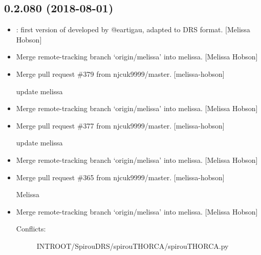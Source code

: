 \documentclass[a4paper,10pt,english]{report}
\begin{document}
\subsection{0.2.080 (2018-08-01)}
\label{\detokenize{misc/changelog:id382}}\begin{itemize}
\item {} 
: first version of  developed by
@eartigau, adapted to DRS format. {[}Melissa Hobson{]}

\item {} 
Merge remote-tracking branch ‘origin/melissa’ into melissa. {[}Melissa
Hobson{]}

\item {} 
Merge pull request \#379 from njcuk9999/master. {[}melissa-hobson{]}

update melissa

\item {} 
Merge remote-tracking branch ‘origin/melissa’ into melissa. {[}Melissa
Hobson{]}

\item {} 
Merge pull request \#377 from njcuk9999/master. {[}melissa-hobson{]}

update melissa

\item {} 
Merge remote-tracking branch ‘origin/melissa’ into melissa. {[}Melissa
Hobson{]}

\item {} 
Merge pull request \#365 from njcuk9999/master. {[}melissa-hobson{]}

Melissa

\item {} 
Merge remote-tracking branch ‘origin/melissa’ into melissa. {[}Melissa
Hobson{]}
\begin{description}
\item[{Conflicts:}] \leavevmode
INTROOT/SpirouDRS/spirouTHORCA/spirouTHORCA.py

\end{description}

\end{itemize}
\end{document}

